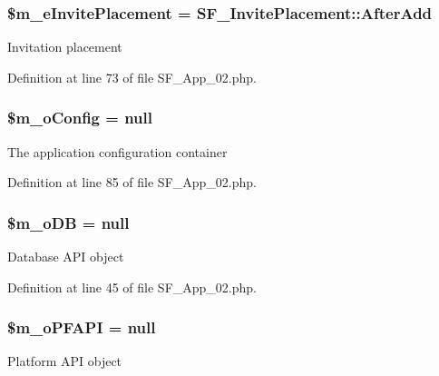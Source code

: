 \hypertarget{classSF__App__02_a78a5b97e38e7a2bc9e36cca0a97a2cca}{
\subsubsection[{\$m\_\-eInvitePlacement}]{\setlength{\rightskip}{0pt plus 5cm}\$m\_\-eInvitePlacement = SF\_\-InvitePlacement::AfterAdd}}
\label{classSF__App__02_a78a5b97e38e7a2bc9e36cca0a97a2cca}
Invitation placement 

Definition at line 73 of file SF\_\-App\_\-02.php.

\hypertarget{classSF__App__02_a0af2b37a09c1015be10cfa60f3f1d1b9}{
\subsubsection[{\$m\_\-oConfig}]{\setlength{\rightskip}{0pt plus 5cm}\$m\_\-oConfig = null}}
\label{classSF__App__02_a0af2b37a09c1015be10cfa60f3f1d1b9}
The application configuration container 

Definition at line 85 of file SF\_\-App\_\-02.php.

\hypertarget{classSF__App__02_af0fd242fc474881efab473522eec0748}{
\subsubsection[{\$m\_\-oDB}]{\setlength{\rightskip}{0pt plus 5cm}\$m\_\-oDB = null}}
\label{classSF__App__02_af0fd242fc474881efab473522eec0748}
Database API object 

Definition at line 45 of file SF\_\-App\_\-02.php.

\hypertarget{classSF__App__02_a23d5b5190ee32c4eb8fff028844b1fa6}{
\subsubsection[{\$m\_\-oPFAPI}]{\setlength{\rightskip}{0pt plus 5cm}\$m\_\-oPFAPI = null}}
\label{classSF__App__02_a23d5b5190ee32c4eb8fff028844b1fa6}
Platform API object 

